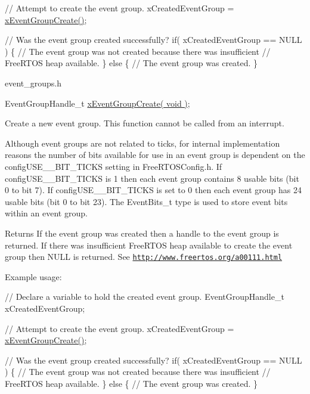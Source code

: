 \begin{DoxyPre} // Attempt to create the event group.
 xCreatedEventGroup = \hyperlink{vendor_2ceedling_2plugins_2freertos_2src_2freertos_2include_2event__groups_8h_a7ed741a0902718aca9c8d3ca273f1b73}{xEventGroupCreate()};\end{DoxyPre}



\begin{DoxyPre} // Was the event group created successfully?
 if( xCreatedEventGroup == NULL )
 \{
     // The event group was not created because there was insufficient
     // FreeRTOS heap available.
 \}
 else
 \{
     // The event group was created.
 \}
\end{DoxyPre}


event\+\_\+groups.\+h 
\begin{DoxyPre}
EventGroupHandle\_t \hyperlink{vendor_2ceedling_2plugins_2freertos_2src_2freertos_2include_2event__groups_8h_a7ed741a0902718aca9c8d3ca273f1b73}{xEventGroupCreate( void )};
\end{DoxyPre}


Create a new event group. This function cannot be called from an interrupt.

Although event groups are not related to ticks, for internal implementation reasons the number of bits available for use in an event group is dependent on the config\+U\+S\+E\+\_\+\_\+\+B\+I\+T\+\_\+\+T\+I\+C\+KS setting in Free\+R\+T\+O\+S\+Config.\+h. If config\+U\+S\+E\+\_\+\_\+\+B\+I\+T\+\_\+\+T\+I\+C\+KS is 1 then each event group contains 8 usable bits (bit 0 to bit 7). If config\+U\+S\+E\+\_\+\_\+\+B\+I\+T\+\_\+\+T\+I\+C\+KS is set to 0 then each event group has 24 usable bits (bit 0 to bit 23). The Event\+Bits\+\_\+t type is used to store event bits within an event group.

\begin{DoxyReturn}{Returns}
If the event group was created then a handle to the event group is returned. If there was insufficient Free\+R\+T\+OS heap available to create the event group then N\+U\+LL is returned. See \href{http://www.freertos.org/a00111.html}{\tt http\+://www.\+freertos.\+org/a00111.\+html}
\end{DoxyReturn}
Example usage\+: 
\begin{DoxyPre}
   // Declare a variable to hold the created event group.
   EventGroupHandle\_t xCreatedEventGroup;\end{DoxyPre}



\begin{DoxyPre}   // Attempt to create the event group.
   xCreatedEventGroup = \hyperlink{vendor_2ceedling_2plugins_2freertos_2src_2freertos_2include_2event__groups_8h_a7ed741a0902718aca9c8d3ca273f1b73}{xEventGroupCreate()};\end{DoxyPre}



\begin{DoxyPre}   // Was the event group created successfully?
   if( xCreatedEventGroup == NULL )
   \{
    // The event group was not created because there was insufficient
    // FreeRTOS heap available.
   \}
   else
   \{
    // The event group was created.
   \}
  \end{DoxyPre}
 